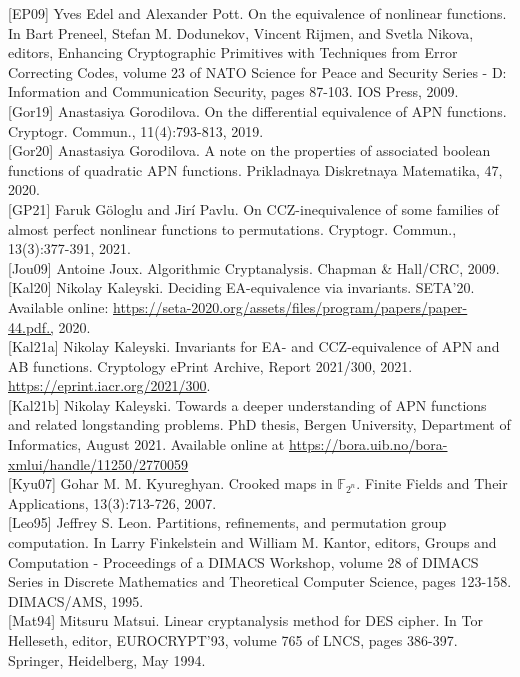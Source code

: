 \documentclass[10pt]{article}
\begin{document}
[EP09] Yves Edel and Alexander Pott. On the equivalence of nonlinear functions. In Bart Preneel, Stefan M. Dodunekov, Vincent Rijmen, and Svetla Nikova, editors, Enhancing Cryptographic Primitives with Techniques from Error Correcting Codes, volume 23 of NATO Science for Peace and Security Series - D: Information and Communication Security, pages 87-103. IOS Press, 2009.\\[0pt]
[Gor19] Anastasiya Gorodilova. On the differential equivalence of APN functions. Cryptogr. Commun., 11(4):793-813, 2019.\\[0pt]
[Gor20] Anastasiya Gorodilova. A note on the properties of associated boolean functions of quadratic APN functions. Prikladnaya Diskretnaya Matematika, 47, 2020.\\[0pt]
[GP21] Faruk Göloglu and Jirí Pavlu. On CCZ-inequivalence of some families of almost perfect nonlinear functions to permutations. Cryptogr. Commun., 13(3):377-391, 2021.\\[0pt]
[Jou09] Antoine Joux. Algorithmic Cryptanalysis. Chapman \& Hall/CRC, 2009.\\[0pt]
[Kal20] Nikolay Kaleyski. Deciding EA-equivalence via invariants. SETA'20. Available online: \href{https://seta-2020.org/assets/files/program/papers/paper-44.pdf.,}{https://seta-2020.org/assets/files/program/papers/paper-44.pdf.,} 2020.\\[0pt]
[Kal21a] Nikolay Kaleyski. Invariants for EA- and CCZ-equivalence of APN and AB functions. Cryptology ePrint Archive, Report 2021/300, 2021. \href{https://eprint.iacr.org/2021/300}{https://eprint.iacr.org/2021/300}.\\[0pt]
[Kal21b] Nikolay Kaleyski. Towards a deeper understanding of APN functions and related longstanding problems. PhD thesis, Bergen University, Department of Informatics, August 2021. Available online at \href{https://bora.uib.no/bora-xmlui/handle/11250/2770059}{https://bora.uib.no/bora-xmlui/handle/11250/2770059}\\[0pt]
[Kyu07] Gohar M. M. Kyureghyan. Crooked maps in $\mathbb{F}_{2^{n}}$. Finite Fields and Their Applications, 13(3):713-726, 2007.\\[0pt]
[Leo95] Jeffrey S. Leon. Partitions, refinements, and permutation group computation. In Larry Finkelstein and William M. Kantor, editors, Groups and Computation - Proceedings of a DIMACS Workshop, volume 28 of DIMACS Series in Discrete Mathematics and Theoretical Computer Science, pages 123-158. DIMACS/AMS, 1995.\\[0pt]
[Mat94] Mitsuru Matsui. Linear cryptanalysis method for DES cipher. In Tor Helleseth, editor, EUROCRYPT'93, volume 765 of LNCS, pages 386-397. Springer, Heidelberg, May 1994.\\[0pt]
\end{document}
